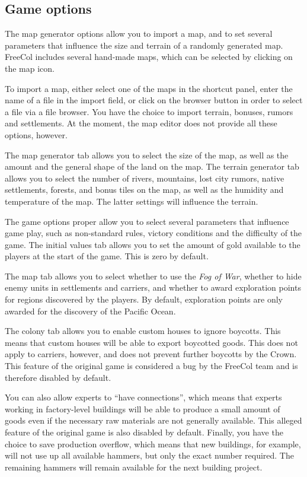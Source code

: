 \documentclass[12pt]{book}
\begin{document}
\hypertarget{Game options}{\subsection{Game options}}

The \hypertarget{map generator options}{map generator options} allow
you to import a map, and to set several parameters that influence the
size and terrain of a randomly generated map. FreeCol includes several
hand-made maps, which can be selected by clicking on the map icon.

To import a map, either select one of the maps in the shortcut panel,
enter the name of a file in the import field, or click on the browser
button in order to select a file via a file browser. You have the
choice to import terrain, bonuses, rumors and settlements. At the
moment, the map editor does not provide all these options, however.

The map generator tab allows you to select the size of the map, as
well as the amount and the general shape of the land on the map. The
terrain generator tab allows you to select the number of rivers,
mountains, lost city rumors, native settlements, forests, and bonus
tiles on the map, as well as the humidity and temperature of the
map. The latter settings will influence the terrain.

The game options proper allow you to select several parameters that
influence game play, such as non-standard rules, victory conditions
and the difficulty of the game. The initial values tab allows you to
set the amount of gold available to the players at the start of the
game. This is zero by default.

The map tab allows you to select whether to use the \textit{Fog of
  War}, whether to hide enemy units in settlements and carriers, and
whether to award exploration points for regions discovered by the
players. By default, exploration points are only awarded for the
discovery of the Pacific Ocean.

The colony tab allows you to enable custom houses to
\hypertarget{ignore boycotts}{ignore boycotts}. This means that custom houses will be able to export
boycotted goods. This does not apply to carriers, however, and does
not prevent further boycotts by the Crown. This feature of the
original game is considered a bug by the FreeCol team and is therefore
disabled by default.

You can also allow experts to ``have connections'', which means that
experts working in factory-level buildings will be able to produce a
small amount of goods even if the necessary raw materials are not
generally available. This alleged feature of the original game is also
disabled by default. Finally, you have the choice to save production
overflow, which means that new buildings, for example, will not use up
all available hammers, but only the exact number required. The
remaining hammers will remain available for the next building project.
\end{document}
